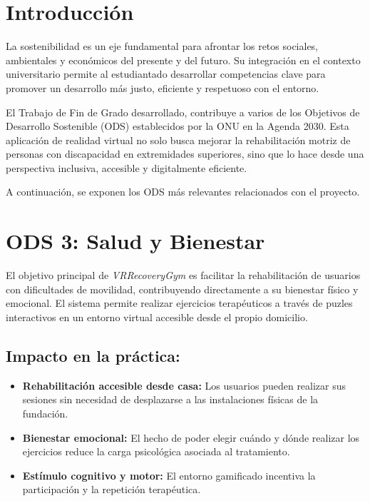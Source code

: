 
\section{Introducción}
La sostenibilidad es un eje fundamental para afrontar los retos sociales, ambientales y económicos del presente y del futuro. Su integración en el contexto universitario permite al estudiantado desarrollar competencias clave para promover un desarrollo más justo, eficiente y respetuoso con el entorno.

El Trabajo de Fin de Grado desarrollado, contribuye a varios de los Objetivos de Desarrollo Sostenible (ODS) establecidos por la ONU en la Agenda 2030. Esta aplicación de realidad virtual no solo busca mejorar la rehabilitación motriz de personas con discapacidad en extremidades superiores, sino que lo hace desde una perspectiva inclusiva, accesible y digitalmente eficiente.

A continuación, se exponen los ODS más relevantes relacionados con el proyecto.

\section{ODS 3: Salud y Bienestar}
El objetivo principal de \textit{VRRecoveryGym} es facilitar la rehabilitación de usuarios con dificultades de movilidad, contribuyendo directamente a su bienestar físico y emocional. El sistema permite realizar ejercicios terapéuticos a través de puzles interactivos en un entorno virtual accesible desde el propio domicilio.

\subsection*{Impacto en la práctica:}
\begin{itemize}
  \item \textbf{Rehabilitación accesible desde casa:} Los usuarios pueden realizar sus sesiones sin necesidad de desplazarse a las instalaciones físicas de la fundación.
  \item \textbf{Bienestar emocional:} El hecho de poder elegir cuándo y dónde realizar los ejercicios reduce la carga psicológica asociada al tratamiento.
  \item \textbf{Estímulo cognitivo y motor:} El entorno gamificado incentiva la participación y la repetición terapéutica.
\end{itemize}

